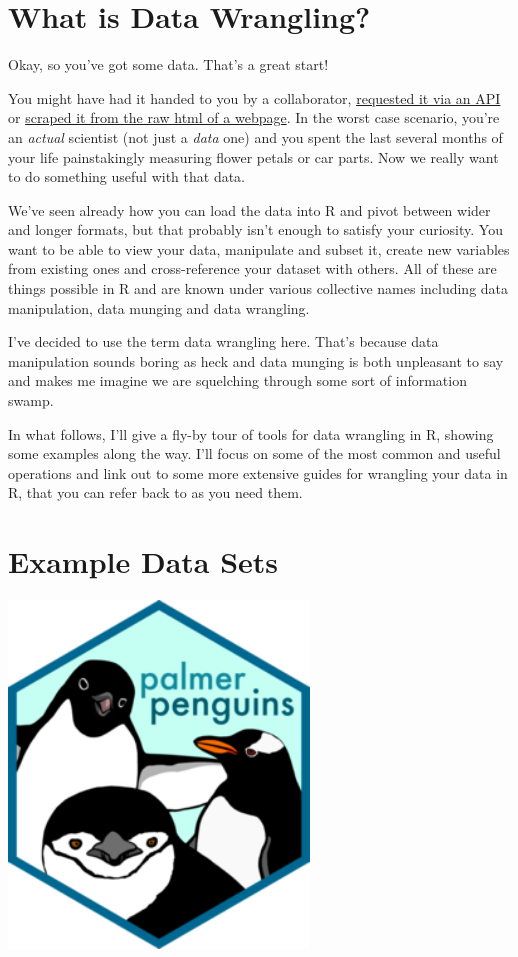 \documentclass[
  letterpaper,
  DIV=11,
  numbers=noendperiod]{scrreprt}
\begin{document}
\section{What is Data Wrangling?}\label{what-is-data-wrangling}

Okay, so you've got some data. That's a great start!

You might have had it handed to you by a collaborator,
\hyperref[data-apis]{requested it via an API} or
\hyperref[data-webscraping]{scraped it from the raw html of a webpage}.
In the worst case scenario, you're an \emph{actual} scientist (not just
a \emph{data} one) and you spent the last several months of your life
painstakingly measuring flower petals or car parts. Now we really want
to do something useful with that data.

We've seen already how you can load the data into R and pivot between
wider and longer formats, but that probably isn't enough to satisfy your
curiosity. You want to be able to view your data, manipulate and subset
it, create new variables from existing ones and cross-reference your
dataset with others. All of these are things possible in R and are known
under various collective names including data manipulation, data munging
and data wrangling.

I've decided to use the term data wrangling here. That's because data
manipulation sounds boring as heck and data munging is both unpleasant
to say and makes me imagine we are squelching through some sort of
information swamp.

In what follows, I'll give a fly-by tour of tools for data wrangling in
R, showing some examples along the way. I'll focus on some of the most
common and useful operations and link out to some more extensive guides
for wrangling your data in R, that you can refer back to as you need
them.

\section{Example Data Sets}\label{example-data-sets}

\begin{center}
\includegraphics[width=0.6\textwidth,height=\textheight]{images/301-edav-wrangling/palmer-penguins.png}
\end{center}
\end{document}
